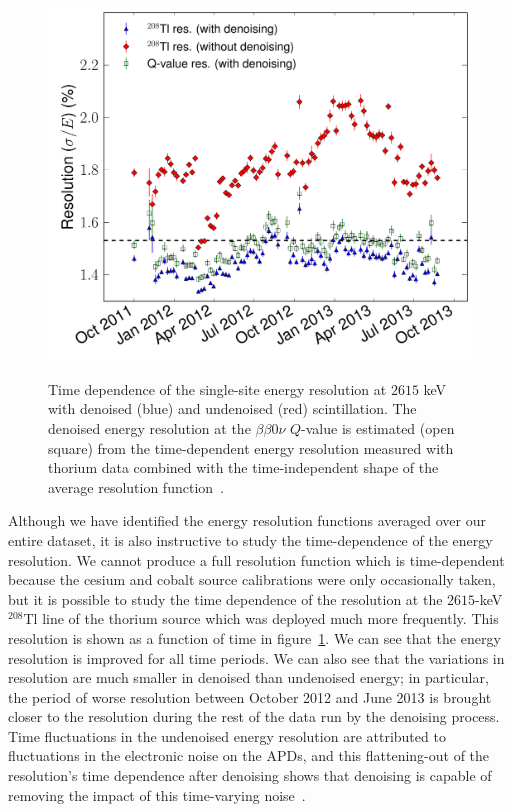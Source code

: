 \begin{figure}
\begin{center}
\includegraphics[keepaspectratio=true,width=\textwidth]{RotatedReso_denoised_compVsTime.pdf}
\end{center}
\renewcommand{\baselinestretch}{1}
\small\normalsize
\begin{quote}
\caption{Time dependence of the single-site energy resolution at $2615$ keV with denoised (blue) and undenoised (red) scintillation.  The denoised energy resolution at the $\beta\beta 0\nu$ $Q$-value is estimated (open square) from the time-dependent energy resolution measured with thorium data combined with the time-independent shape of the average resolution function~\cite{NewEXObb0nPaper_2014}.}
\label{fig:ResolutionTimeDependenceComparison}
\end{quote}
\end{figure}
\renewcommand{\baselinestretch}{2}
\small\normalsize

Although we have identified the energy resolution functions averaged over our entire dataset, it is also instructive to study the time-dependence of the energy resolution.  We cannot produce a full resolution function which is time-dependent because the cesium and cobalt source calibrations were only occasionally taken, but it is possible to study the time dependence of the resolution at the $2615$-keV $^{208}$Tl line of the thorium source which was deployed much more frequently.  This resolution is shown as a function of time in figure~\ref{fig:ResolutionTimeDependenceComparison}.  We can see that the energy resolution is improved for all time periods.  We can also see that the variations in resolution are much smaller in denoised than undenoised energy; in particular, the period of worse resolution between October 2012 and June 2013 is brought closer to the resolution during the rest of the data run by the denoising process.  Time fluctuations in the undenoised energy resolution are attributed to fluctuations in the electronic noise on the APDs, and this flattening-out of the resolution's time dependence after denoising shows that denoising is capable of removing the impact of this time-varying noise~\cite{NewEXObb0nPaper_2014}.


